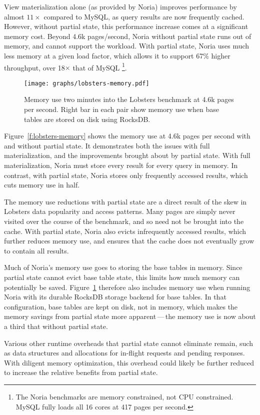 View materialization alone (as provided by Noria) improves performance by almost
$11\times$ compared to MySQL, as query results are now frequently cached.
However, without partial state, this performance increase comes at a significant
memory cost. Beyond 4.6k pages/second, Noria without partial state runs out of
memory, and cannot support the workload. With partial state, Noria uses much
less memory at a given load factor, which allows it to support 67\% higher
throughput, over 18$\times$ that of MySQL%
\footnote{The Noria benchmarks are memory constrained, not CPU constrained.
MySQL fully loads all 16 cores at 417 pages per second.}.

\begin{figure}[h]
  \centering
  \texttt{[image: graphs/lobsters-memory.pdf]}
  \caption{Memory use two minutes into the Lobsters benchmark at 4.6k pages per
  second. Right bar in each pair show memory use when base tables are stored on
  disk using RocksDB.}
  \label{f:lobsters-memory}
\end{figure}

Figure~\vref{f:lobsters-memory} shows the memory use at 4.6k pages per second
with and without partial state. It demonstrates both the issues with full
materialization, and the improvements brought about by partial state. With full
materialization, Noria must store every result for every query in memory. In
contrast, with partial state, Noria stores only frequently accessed results,
which cuts memory use in half.

The memory use reductions with partial state are a direct result of the skew in
Lobsters data popularity and access patterns. Many pages are simply never
visited over the course of the benchmark, and so need not be brought into the
cache. With partial state, Noria also evicts infrequently accessed results,
which further reduces memory use, and ensures that the cache does not eventually
grow to contain all results.

Much of Noria's memory use goes to storing the base tables in memory. Since
partial state cannot evict base table state, this limits how much memory can
potentially be saved. Figure~\ref{f:lobsters-memory} therefore also includes
memory use when running Noria with its durable RocksDB storage backend for base
tables. In that configuration, base tables are kept on disk, not in memory,
which makes the memory savings from partial state more apparent\,---\,the memory
use is now about a third that without partial state.

Various other runtime overheads that partial state cannot eliminate remain, such
as data structures and allocations for in-flight requests and pending responses.
With diligent memory optimization, this overhead could likely be further reduced
to increase the relative benefits from partial state.

